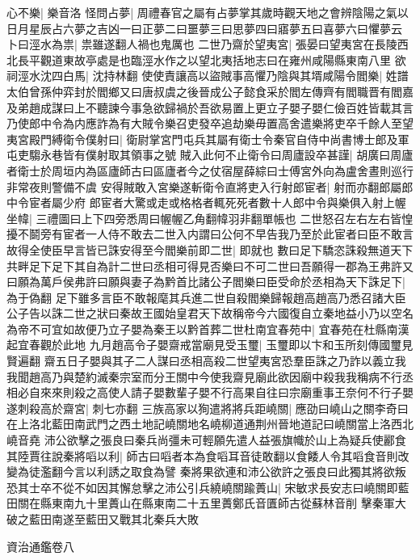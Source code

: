 心不樂|{
	樂音洛}
怪問占夢|{
	周禮春官之屬有占夢掌其歲時觀天地之會辨陰陽之氣以日月星辰占六夢之吉凶一曰正夢二曰噩夢三曰思夢四曰寤夢五曰喜夢六曰懼夢云}
卜曰涇水為祟|{
	祟雖遂翻人禍也鬼厲也}
二世乃齋於望夷宮|{
	張晏曰望夷宮在長陵西北長平觀道東故亭處是也臨涇水作之以望北夷括地志曰在雍州咸陽縣東南八里}
欲祠涇水沈四白馬|{
	沈持林翻}
使使責讓高以盜賊事高懼乃陰與其壻咸陽令閻樂|{
	姓譜太伯曾孫仲弈封於閻鄉又曰唐叔虞之後晉成公子懿食采於閻左傳齊有閻職晋有閻嘉}
及弟趙成謀曰上不聽諫今事急欲歸禍於吾欲易置上更立子嬰子嬰仁儉百姓皆載其言乃使郎中令為内應詐為有大賊令樂召吏發卒追劫樂毋置高舍遣樂將吏卒千餘人至望夷宮殿門縛衛令僕射曰|{
	衛尉掌宮門屯兵其屬有衛士令秦官自侍中尚書博士郎及軍屯吏騶永巷皆有僕射取其領事之號}
賊入此何不止衛令曰周廬設卒甚謹|{
	胡廣曰周廬者衛士於周垣内為區廬師古曰區廬者今之仗宿屋薛綜曰士傅宮外向為盧舍晝則巡行非常夜則警備不虞}
安得賊敢入宮樂遂斬衛令直將吏入行射郎宦者|{
	射而亦翻郎屬郎中令宦者屬少府}
郎宦者大驚或走或格格者輒死死者數十人郎中令與樂俱入射上幄坐幃|{
	三禮圖曰上下四旁悉周曰幄幄乙角翻幃羽非翻單帳也}
二世怒召左右左右皆惶擾不鬬旁有宦者一人侍不敢去二世入内謂曰公何不早告我乃至於此宦者曰臣不敢言故得全使臣早言皆已誅安得至今閻樂前即二世|{
	即就也}
數曰足下驕恣誅殺無道天下共畔足下足下其自為計二世曰丞相可得見否樂曰不可二世曰吾願得一郡為王弗許又曰願為萬戶侯弗許曰願與妻子為黔首比諸公子閻樂曰臣受命於丞相為天下誅足下|{
	為于偽翻}
足下雖多言臣不敢報麾其兵進二世自殺閻樂歸報趙高趙高乃悉召諸大臣公子告以誅二世之狀曰秦故王國始皇君天下故稱帝今六國復自立秦地益小乃以空名為帝不可宜如故便乃立子嬰為秦王以黔首葬二世杜南宜春苑中|{
	宜春苑在杜縣南漢起宜春觀於此地}
九月趙高令子嬰齋戒當廟見受玉璽|{
	玉璽即以卞和玉所刻傳國璽見賢遍翻}
齋五日子嬰與其子二人謀曰丞相高殺二世望夷宮恐羣臣誅之乃詐以義立我我聞趙高乃與楚約滅秦宗室而分王關中今使我齋見廟此欲因廟中殺我我稱病不行丞相必自來來則殺之高使人請子嬰數輩子嬰不行高果自往曰宗廟重事王奈何不行子嬰遂刺殺高於齋宮|{
	刺七亦翻}
三族高家以狥遣將將兵距嶢關|{
	應劭曰嶢山之關李奇曰在上洛北藍田南武門之西土地記嶢關地名嶢柳道通荆州晉地道記曰嶢關當上洛西北嶢音堯}
沛公欲擊之張良曰秦兵尚彊未可輕願先遣人益張旗幟於山上為疑兵使酈食其陸賈往說秦將㗖以利|{
	師古曰㗖者本為食㗖耳音徒敢翻以食餧人令其㗖食音則改變為徒濫翻今言以利誘之取食為譬}
秦將果欲連和沛公欲許之張良曰此獨其將欲叛恐其士卒不從不如因其懈怠擊之沛公引兵繞嶢關踰蕢山|{
	宋敏求長安志曰嶢關即藍田關在縣東南九十里蕢山在縣東南二十五里蕢鄭氏音匱師古從蘇林音削}
擊秦軍大破之藍田南遂至藍田又戰其北秦兵大敗

資治通鑑卷八
